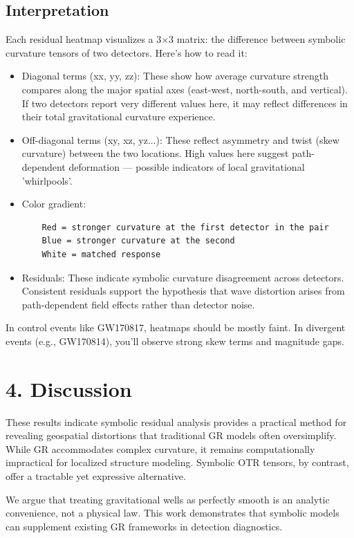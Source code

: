 \documentclass[11pt]{article}
\begin{document}
	\subsection*{Interpretation}
	Each residual heatmap visualizes a 3×3 matrix: the difference between symbolic curvature tensors of two detectors. Here's how to read it:
	
	\begin{itemize}
	\item Diagonal terms (xx, yy, zz): These show how average curvature strength compares along the major spatial axes (east-west, north-south, and vertical). If two detectors report very different values here, it may reflect differences in their total gravitational curvature experience.	
	\item Off-diagonal terms (xy, xz, yz...): These reflect asymmetry and twist (skew curvature) between the two locations. High values here suggest path-dependent deformation — possible indicators of local gravitational 'whirlpools'.
	\item Color gradient:
	\begin{verbatim}	
	Red = stronger curvature at the first detector in the pair
	Blue = stronger curvature at the second
	White = matched response
    \end{verbatim}   
	\item Residuals: These indicate symbolic curvature disagreement across detectors. Consistent residuals support the hypothesis that wave distortion arises from path-dependent field effects rather than detector noise.
	\end{itemize}
	
	In control events like GW170817, heatmaps should be mostly faint. In divergent events (e.g., GW170814), you'll observe strong skew terms and magnitude gaps.

    
	\section*{4. Discussion}
	These results indicate symbolic residual analysis provides a practical method for revealing geospatial distortions that traditional GR models often oversimplify. While GR accommodates complex curvature, it remains computationally impractical for localized structure modeling. Symbolic OTR tensors, by contrast, offer a tractable yet expressive alternative.
	
	We argue that treating gravitational wells as perfectly smooth is an analytic convenience, not a physical law. This work demonstrates that symbolic models can supplement existing GR frameworks in detection diagnostics.
	
\end{document}
